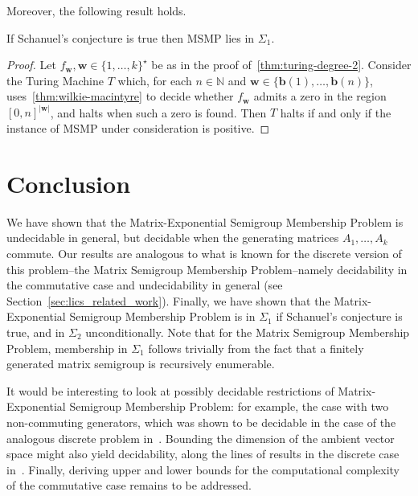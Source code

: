 \documentclass[format=acmsmall, review=false, screen=true]{acmart}
\newcommand{\Naturals}{\mathbb{N}}
\newcommand{\myvector}{\boldsymbol}
\begin{document}
Moreover, the following result holds.

\begin{theorem}
\label{thm:turing-degree-1}
If Schanuel's conjecture is true then $\mbox{MSMP}$ lies in $\Sigma_1$.
\end{theorem}

\begin{proof}
Let $f_{\myvector{w}}, \myvector{w} \in {\lbrace 1, \ldots, k
  \rbrace}^{\star}$ be as in the proof of~\cref{thm:turing-degree-2}.
Consider the Turing Machine $T$ which, for each $n \in \Naturals$ and
$\myvector{w} \in \lbrace \myvector{b}(1), \ldots, \myvector{b}(n)
\rbrace$, uses~\cref{thm:wilkie-macintyre} to decide whether
$f_{\myvector{w}}$ admits a zero in the region ${[0,n]}^{\lvert
  \myvector{w} \rvert}$, and halts when such a zero is found.  Then
$T$ halts if and only if the instance of MSMP under consideration is
positive.
\end{proof}

\section{Conclusion}

We have shown that the Matrix-Exponential Semigroup Membership Problem
is undecidable in general, but decidable when the generating matrices
$A_{1}, \ldots, A_{k}$ commute.  Our results are analogous to what is
known for the discrete version of this problem--the Matrix Semigroup
Membership Problem--namely decidability in the commutative case and
undecidability in general (see Section~\ref{sec:lics_related_work}).
Finally, we have shown that the Matrix-Exponential Semigroup
Membership Problem is in $\Sigma_{1}$ if Schanuel's conjecture is
true, and in $\Sigma_{2}$ unconditionally. Note that for the Matrix
Semigroup Membership Problem, membership in $\Sigma_{1}$ follows
trivially from the fact that a finitely generated matrix semigroup is
recursively enumerable.

It would be interesting to look at possibly decidable restrictions of
Matrix-Exponential Semigroup Membership Problem: for example, the case
with two non-commuting generators, which was shown to be decidable in
the case of the analogous discrete problem in~\cite{MEHTP}. Bounding
the dimension of the ambient vector space might also yield
decidability, along the lines of results in the discrete case
in~\cite{PS2Z}.  Finally, deriving upper and lower bounds for the
computational complexity of the commutative case remains to be
addressed.



\end{document}
